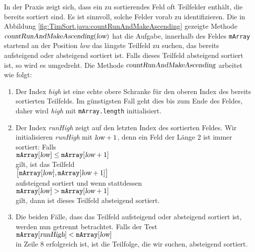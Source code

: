\noindent
In der Praxis zeigt sich, dass ein zu sortierendes Feld
oft Teilfelder enth\"alt, die bereits sortiert sind.  Es ist sinnvoll, solche Felder vorab zu
identifizieren.  Die in Abbildung \ref{fig:TimSort.java:countRunAndMakeAscending} gezeigte
 Methode $\textsl{countRunAndMakeAscending}(\textsl{low})$ hat die Aufgabe,
innerhalb des Feldes \texttt{mArray}  startend an der Position \textsl{low} das l\"angste Teilfeld zu
suchen, das bereits aufsteigend oder absteigend sortiert ist.   Falls dieses Teilfeld absteigend
sortiert ist, so wird es umgedreht.  Die Methode $\textsl{countRunAndMakeAscending}$ arbeitet
wie folgt:
\begin{enumerate}
\item Der Index \textsl{high} ist eine echte obere Schranke f\"ur den oberen Index des bereits 
      sortierten Teilfelds.  Im g\"unstigsten Fall geht dies bis zum Ende des Feldes,
      daher wird \textsl{high} mit \texttt{mArray.length} initialisiert.
\item Der Index \textsl{runHigh} zeigt auf den letzten Index des sortierten Feldes.
      Wir initialisieren \textsl{runHigh} mit $\textsl{low} + 1$, denn ein Feld der L\"ange 2
      ist immer sortiert:  Falls
      \\[0.2cm]
      \hspace*{1.3cm}
      $\mathtt{mArray}[\textsl{low}] \leq \mathtt{mArray}[\textsl{low} + 1]$
      \\[0.2cm]
      gilt, ist das Teilfeld 
      \\[0.2cm]
      \hspace*{1.3cm}
      $\bigl[\mathtt{mArray}[\textsl{low}], \mathtt{mArray}[\textsl{low} + 1]\bigr]$
      \\[0.2cm]
      aufsteigend sortiert und wenn stattdessen \\[0.2cm]
      \hspace*{1.3cm}
      $\mathtt{mArray}[\textsl{low}] > \mathtt{mArray}[\textsl{low} + 1]$
      \\[0.2cm]
      gilt, dann ist dieses Teilfeld absteigend sortiert.
\item Die beiden F\"alle, dass das Teilfeld aufsteigend oder absteigend sortiert ist, werden nun 
      getrennt betrachtet.  Falls der Test 
      \\[0.2cm]
      \hspace*{1.3cm}
      $\mathtt{mArray}[\textsl{runHigh}] < \mathtt{mArray}[\textsl{low}]$
      \\[0.2cm]
      in Zeile 8 erfolgreich ist, ist die Teilfolge, die wir suchen, absteigend sortiert.

\end{enumerate}
